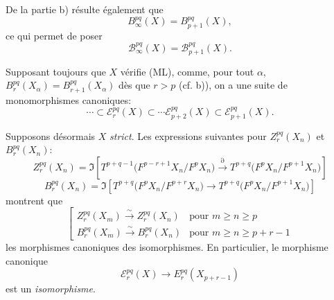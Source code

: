 De la partie b) résulte également que
\[
B_\infty^{pq}(X)=B_{p+1}^{pq}(X),
\]
ce qui permet de poser
\[
\mathcal{B}_\infty^{pq}(X)=\mathcal{B}_{p+1}^{pq}(X).
\]

Supposant toujours que \(X\) vérifie (ML), comme, pour tout \(\alpha\),
\(B_r^{pq}(X_\alpha)=B_{r+1}^{pq}(X_\alpha)\) dès que \(r>p\) (cf. b)),
on a une suite de monomorphismes canoniques:
\begin{equation}
\cdots\subset\mathcal{E}_r^{pq}(X)\subset\cdots\mathcal{E}_{p+2}^{pq}(X)\subset\mathcal{E}_{p+1}^{pq}(X).
\tag{S}
\end{equation}

Supposons désormais \(X\) \emph{strict}. Les expressions suivantes pour \(Z_r^{pq}(X_n)\) et \(B_r^{pq}(X_n)\):
\[
Z_r^{pq}(X_n)=
\Im\!\left[
T^{p+q-1}\bigl(F^{p-r+1}X_n/F^pX_n\bigr)
\xrightarrow{\partial}
T^{p+q}\bigl(F^pX_n/F^{p+1}X_n\bigr)
\right]
\]
\[
B_r^{pq}(X_n)=
\Im\!\left[
T^{p+q}\bigl(F^pX_n/F^{p+r}X_n\bigr)
\longrightarrow
T^{p+q}\bigl(F^pX_n/F^{p+1}X_n\bigr)
\right]
\]
montrent que
\begin{equation}
\left[
\begin{array}{ll}
Z_r^{pq}(X_m)\xrightarrow{\sim}Z_r^{pq}(X_n)&\text{pour }m\ge n\ge p\\[3pt]
B_r^{pq}(X_m)\xrightarrow{\sim}B_r^{pq}(X_n)&\text{pour }m\ge n\ge p+r-1
\end{array}
\right.
\tag{\(d_1\)}
\end{equation}
les morphismes canoniques  des isomorphismes. En particulier, le morphisme canonique
\[
\mathcal{E}_r^{pq}(X)\longrightarrow E_r^{pq}(X_{p+r-1})
\]
est un \emph{isomorphisme}.

